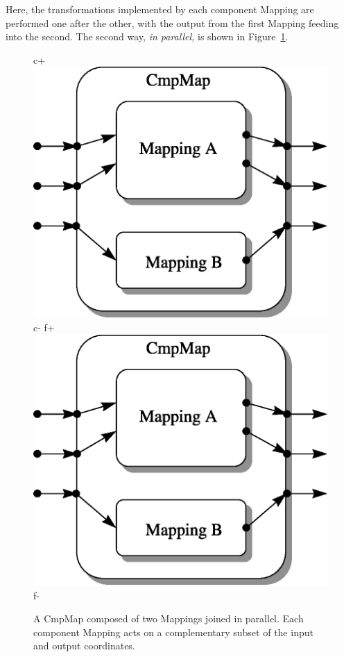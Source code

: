 \documentclass[twoside,11pt]{article}
\newenvironment{latexonly}{}{}
\begin{document}
\begin{latexonly}
   Here, the transformations implemented by each component Mapping are
   performed one after the other, with the output from the first Mapping
   feeding into the second.  The second way, {\em{in parallel,}} is shown in
   Figure~\ref{fig:parallelcmpmap}.
   \begin{figure}
   \begin{center}
c+
   \includegraphics[scale=0.75]{sun211_figures/parallel.eps}
c-
f+
   \includegraphics[scale=0.75]{sun210_figures/parallel.eps}
f-
   \caption{A CmpMap composed of two Mappings joined in parallel. Each
   component Mapping acts on a complementary subset of the input and
   output coordinates.}
   \label{fig:parallelcmpmap}
   \end{center}
   \end{figure}
\end{latexonly}
\end{document}
